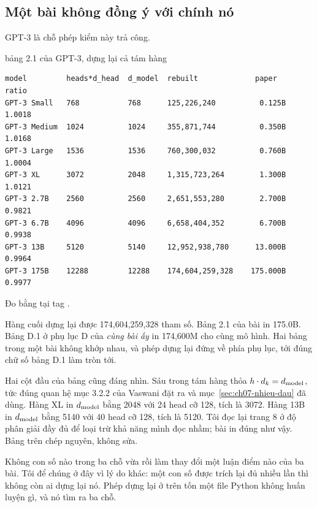 \subsection*{Một bài không đồng ý với chính nó}

%
GPT-3 là chỗ phép kiểm này trả công.

\begin{measured}{bảng 2.1 của GPT-3, dựng lại cả tám hàng}
\begin{verbatim}
model         heads*d_head  d_model  rebuilt             paper     ratio
GPT-3 Small   768           768      125,226,240          0.125B   1.0018
GPT-3 Medium  1024          1024     355,871,744          0.350B   1.0168
GPT-3 Large   1536          1536     760,300,032          0.760B   1.0004
GPT-3 XL      3072          2048     1,315,723,264        1.300B   1.0121
GPT-3 2.7B    2560          2560     2,651,553,280        2.700B   0.9821
GPT-3 6.7B    4096          4096     6,658,404,352        6.700B   0.9938
GPT-3 13B     5120          5140     12,952,938,780      13.000B   0.9964
GPT-3 175B    12288         12288    174,604,259,328    175.000B   0.9977
\end{verbatim}

Đo bằng  tại tag .
\end{measured}

Hàng cuối dựng lại được 174,604,259,328 tham số. Bảng 2.1 của bài in 175.0B.
Bảng D.1 ở phụ lục D của \emph{cùng bài ấy} in 174,600M cho cùng mô hình. Hai
bảng trong một bài không khớp nhau, và phép dựng lại đứng về phía phụ lục, tới
đúng chữ số bảng D.1 làm tròn tới.

Hai cột đầu của bảng cũng đáng nhìn. Sáu trong tám hàng thỏa
\(h \cdot d_{k} = d_{\mathrm{model}}\), tức đúng quan hệ mục 3.2.2 của Vaswani đặt ra và
mục~\ref{sec:ch07-nhieu-dau} đã dùng. Hàng XL in \(d_{\mathrm{model}}\) bằng 2048 với 24
head cỡ 128, tích là 3072. Hàng 13B in \(d_{\mathrm{model}}\) bằng 5140 với 40 head cỡ
128, tích là 5120. Tôi đọc lại trang 8 ở độ phân giải đầy đủ để loại trừ khả
năng mình đọc nhầm; bài in đúng như vậy. Bảng trên chép nguyên, không sửa.

Không con số nào trong ba chỗ vừa rồi làm thay đổi một luận điểm nào của ba
bài. Tôi để chúng ở đây vì lý do khác: một con số được trích lại đủ nhiều lần
thì không còn ai dựng lại nó. Phép dựng lại ở trên tốn một file Python không
huấn luyện gì, và nó tìm ra ba chỗ.
